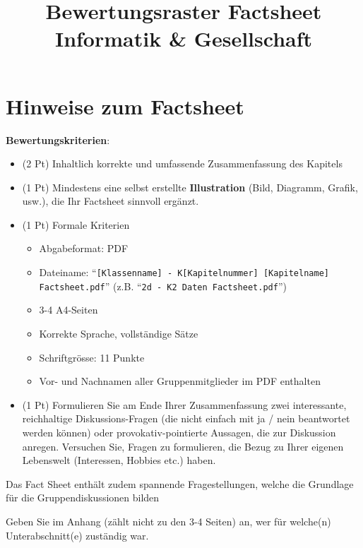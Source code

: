 
\title{Bewertungsraster Factsheet\\ \large Informatik \& Gesellschaft}

\maketitle

\section*{Hinweise zum Factsheet}

\textbf{Bewertungskriterien}:
\begin{itemize}
    \item (2 Pt) Inhaltlich korrekte und umfassende Zusammenfassung des Kapitels
    \item (1 Pt) Mindestens eine selbst erstellte \textbf{Illustration} (Bild, Diagramm, Grafik, usw.), die Ihr Factsheet sinnvoll ergänzt.
    \item (1 Pt) Formale Kriterien
    \begin{itemize}
        \item Abgabeformat: PDF
        \item Dateiname: ``\texttt{[Klassenname] - K[Kapitelnummer] [Kapitelname] Factsheet.pdf}'' (z.B. ``\texttt{2d - K2 Daten Factsheet.pdf}'')
        \item 3-4 A4-Seiten
        \item Korrekte Sprache, vollständige Sätze
        \item Schriftgrösse: 11 Punkte
        \item Vor- und Nachnamen aller Gruppenmitglieder im PDF enthalten
    \end{itemize}
    \item (1 Pt) Formulieren Sie am Ende Ihrer Zusammenfassung zwei interessante, reichhaltige Diskussions-Fragen (die nicht einfach mit ja / nein beantwortet werden können) oder provokativ-pointierte Aussagen, die zur Diskussion anregen. Versuchen Sie, Fragen zu formulieren, die Bezug zu Ihrer eigenen Lebenswelt (Interessen, Hobbies etc.) haben.
\end{itemize}


Das Fact Sheet enthält zudem spannende Fragestellungen, welche die Grundlage für die Gruppendiskussionen bilden

Geben Sie im Anhang (zählt nicht zu den 3-4 Seiten) an, wer für welche(n) Unterabschnitt(e) zuständig war.

